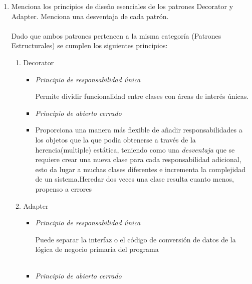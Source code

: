 \documentclass[a4paper,10pt]{article}
\begin{document}
\begin{enumerate}
    
    \item Menciona los principios de diseño esenciales de los patrones Decorator y Adapter. Menciona una desventaja de cada patrón.\\\\
    
        Dado que ambos patrones pertencen a la misma categoría (Patrones Estructurales) se cumplen los siguientes principios:
        \begin{enumerate}
            \item \colorbox[rgb]{0.53, 0.81, 0.98}{Decorator}
            \begin{itemize}
               \item \textit{Principio de responsabilidad única}
               
                      Permite dividir funcionalidad entre clases con áreas de interés únicas. 
               
               \item \textit{Principio de abierto cerrado}  

                \item Proporciona una manera más flexible de añadir responsabilidades a los objetos que la que podia obtenerse a través de la herencia(multiple) estática, teniendo como una \textit{desventaja} que se 
                requiere crear una nueva clase para cada responsabilidad adicional, esto da lugar a muchas clases diferentes e incrementa la complejidad de un sistema.Heredar dos veces una clase resulta cuanto menos, propenso a errores             
                      
            \end{itemize}

            
            \item \colorbox[rgb]{1.0, 0.71, 0.76}{Adapter}
            \begin{itemize}
                \item \textit{Principio de responsabilidad única}
                
                      Puede separar la interfaz o el código de conversión de datos de la lógica de negocio primaria del programa\\\\  

                \item \textit{Principio de abierto cerrado}
                

\end{itemize}
\end{enumerate}
\end{enumerate}
\end{document}
